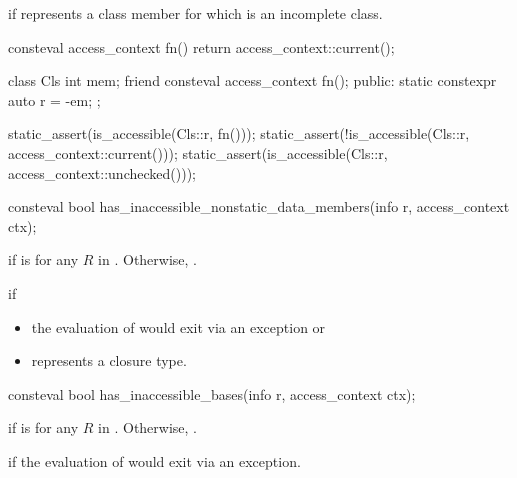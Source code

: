 \begin{itemdescr}
\pnum
\throws
{} if
   represents a class member
  for which  is an incomplete class.

\pnum
\begin{example}
\begin{codeblock}
consteval access_context fn() {
  return access_context::current();
}

class Cls {
  int mem;
  friend consteval access_context fn();
public:
  static constexpr auto r = ^^mem;
};

static_assert(is_accessible(Cls::r, fn()));
static_assert(!is_accessible(Cls::r, access_context::current()));
static_assert(is_accessible(Cls::r, access_context::unchecked()));
\end{codeblock}
\end{example}
\end{itemdescr}

%
\begin{itemdecl}
consteval bool has_inaccessible_nonstatic_data_members(info r, access_context ctx);
\end{itemdecl}

\begin{itemdescr}
\pnum
\returns
{} if  is 
for any $R$ in .
Otherwise, .

\pnum
\throws
{} if
\begin{itemize}
\item
  the evaluation of
  would exit via an exception or
\item
   represents a closure type.
\end{itemize}
\end{itemdescr}

%
\begin{itemdecl}
consteval bool has_inaccessible_bases(info r, access_context ctx);
\end{itemdecl}

\begin{itemdescr}
\pnum
\returns
{} if  is 
for any $R$ in .
Otherwise, .

\pnum
\throws
{} if the evaluation of
would exit via an exception.
\end{itemdescr}

